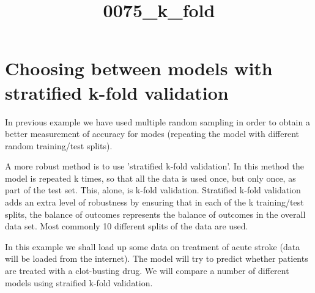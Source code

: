 \documentclass[11pt]{article}
\title{0075\_k\_fold}
\begin{document}
    
    
    \maketitle
    
    

    
    \section{Choosing between models with stratified k-fold
validation}\label{choosing-between-models-with-stratified-k-fold-validation}

In previous example we have used multiple random sampling in order to
obtain a better measurement of accuracy for modes (repeating the model
with different random training/test splits).

A more robust method is to use 'stratified k-fold validation'. In this
method the model is repeated k times, so that all the data is used once,
but only once, as part of the test set. This, alone, is k-fold
validation. Stratified k-fold validation adds an extra level of
robustness by ensuring that in each of the k training/test splits, the
balance of outcomes represents the balance of outcomes in the overall
data set. Most commonly 10 different splits of the data are used.

In this example we shall load up some data on treatment of acute stroke
(data will be loaded from the internet). The model will try to predict
whether patients are treated with a clot-busting drug. We will compare a
number of different models using straified k-fold validation.
\end{document}
